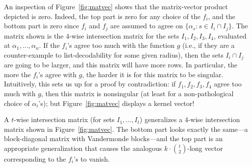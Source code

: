 \documentclass[11pt]{article}
\begin{document}
An inspection of Figure~\ref{fig:matvec} shows that the matrix-vector product depicted is zero.  Indeed, the top part is zero for any choice of the $f_i$, and the bottom part is zero since $f_i$ and $f_j$ are assumed to agree on $\{\alpha_s:s\in I_i \cap I_j\}$. The matrix shown is the $4$-wise intersection matrix for the sets $I_1, I_2, I_3, I_4$, evaluated at $\alpha_1, \ldots, \alpha_n$.  If the $f_i$'s agree too much with the function $g$ (i.e., if they are a counter-example to list-decodability for some given radius), then the sets $I_i \cap I_j$ are going to be larger, and this matrix will have more rows.  In particular, the more the $f_i$'s agree with $g$, the harder it is for this matrix to be singular.  Intuitively, this sets us up for a proof by contradiction: if $f_1, f_2, f_3, f_4$ agree too much with $g$, then this matrix is nonsingular (at least for a non-pathological choice of $\alpha_i$'s); but Figure~\ref{fig:matvec} displays a kernel vector!

A $t$-wise intersection matrix (for sets $I_1, \ldots, I_t$) generalizes a $4$-wise intersection matrix shown in Figure~\ref{fig:matvec}.  The bottom part looks exactly the same---a block-diagonal matrix with Vandermonde blocks---and the top part is an appropriate generalization that causes the analogous $k\cdot{t \choose 2}$-long vector corresponding to the $f_i$'s to vanish.
\end{document}
